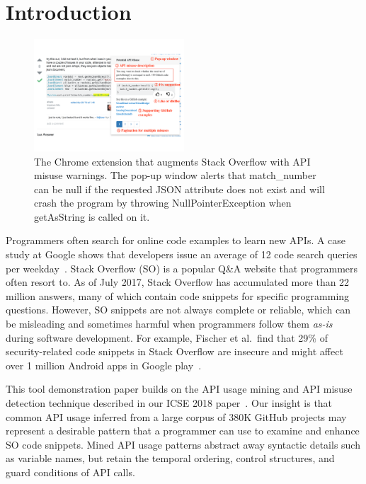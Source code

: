 \section{Introduction}
\label{sec:intro}

\begin{figure}
\centering
\includegraphics[width=0.5\textwidth]{examplecheck-screenshot.pdf}
  \caption{The {\tool} Chrome extension that augments Stack Overflow with API misuse warnings. The pop-up window alerts that {\ttt match\_number} can be {\ttt null} if the requested {\ttt JSON} attribute does not exist and will crash the program by throwing {\ttt NullPointerException} when {\ttt getAsString} is called on it.}
  \label{fig:screenshot}
  \vspace{-0.1in}
\end{figure}

Programmers often search for online code examples to learn new APIs. A case study at Google shows that developers issue an average of 12 code search queries per weekday~\cite{sadowski2015developers}. Stack Overflow (SO) is a popular Q\&A website that programmers often resort to. As of July 2017, Stack Overflow has accumulated more than 22 million answers, many of which contain code snippets for specific programming questions. However, SO snippets are not always complete or reliable, which can be misleading and sometimes harmful when programmers follow them {\em as-is} during software development. For example, Fischer et al.~find that 29\% of security-related code snippets in Stack Overflow are insecure and might affect over 1 million Android apps in Google play~\cite{fischer2017stack}. 

This tool demonstration paper builds on the API usage mining and API misuse detection technique described in our ICSE 2018 paper~\cite{zhang2018code}. Our insight is that common API usage inferred from a large corpus of 380K GitHub projects may represent a desirable pattern that a programmer can use to examine and enhance SO code snippets. Mined API usage patterns abstract away syntactic details such as variable names, but retain the temporal ordering, control structures, and guard conditions of API calls. 

